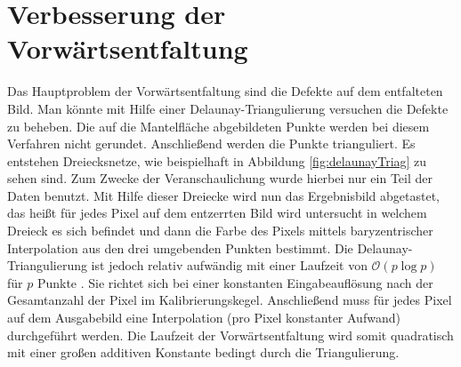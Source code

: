 \section{Verbesserung der Vorwärtsentfaltung}
Das Hauptproblem der Vorwärtsentfaltung sind die Defekte auf dem entfalteten Bild. Man könnte mit Hilfe einer Delaunay-Triangulierung versuchen die Defekte zu beheben.
Die auf die Mantelfläche abgebildeten Punkte werden bei diesem Verfahren nicht gerundet. Anschließend werden die Punkte trianguliert. Es entstehen Dreiecksnetze, wie beispielhaft in Abbildung \ref{fig:delaunayTriag} zu sehen sind. Zum Zwecke der Veranschaulichung wurde hierbei nur ein Teil der Daten benutzt. Mit Hilfe dieser Dreiecke wird nun das Ergebnisbild abgetastet, das heißt für jedes Pixel auf dem entzerrten Bild wird untersucht in welchem Dreieck es sich befindet und dann die Farbe des Pixels mittels baryzentrischer Interpolation aus den drei umgebenden Punkten bestimmt. Die Delaunay-Triangulierung ist jedoch relativ aufwändig mit einer Laufzeit von $\mathcal{O}(p\log p)$ für $p$ Punkte \cite{Su1997}. Sie richtet sich bei einer konstanten Eingabeauflösung nach der Gesamtanzahl der Pixel im Kalibrierungskegel. Anschließend muss für jedes Pixel auf dem Ausgabebild eine Interpolation (pro Pixel konstanter Aufwand) durchgeführt werden. Die Laufzeit der Vorwärtsentfaltung wird somit quadratisch mit einer großen additiven Konstante bedingt durch die Triangulierung.


